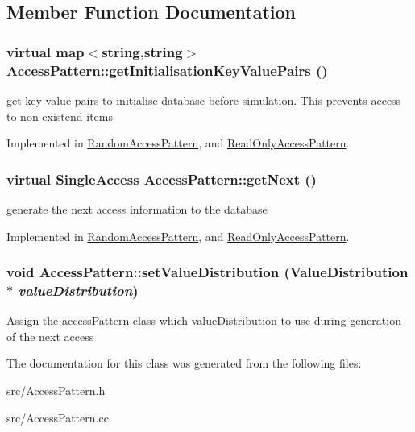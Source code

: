 \subsection{Member Function Documentation}
\hypertarget{classAccessPattern_afa72bed11401bfd96e8fa88acd72934b}{
\subsubsection[{getInitialisationKeyValuePairs}]{\setlength{\rightskip}{0pt plus 5cm}virtual map$<$string,string$>$ AccessPattern::getInitialisationKeyValuePairs ()}}
\label{classAccessPattern_afa72bed11401bfd96e8fa88acd72934b}
get key-\/value pairs to initialise database before simulation. This prevents access to non-\/existend items 

Implemented in \hyperlink{classRandomAccessPattern_a72da825a9cb74f58fcadf6fc894d5e82}{RandomAccessPattern}, and \hyperlink{classReadOnlyAccessPattern_a2e6ce8d90050b038ffbf643b344e0eb5}{ReadOnlyAccessPattern}.\hypertarget{classAccessPattern_a8c46aedb717e862598524f250f23086f}{
\subsubsection[{getNext}]{\setlength{\rightskip}{0pt plus 5cm}virtual {\bf SingleAccess} AccessPattern::getNext ()}}
\label{classAccessPattern_a8c46aedb717e862598524f250f23086f}
generate the next access information to the database 

Implemented in \hyperlink{classRandomAccessPattern_a5b590afc37a8bf5e4a4235834c6ebe12}{RandomAccessPattern}, and \hyperlink{classReadOnlyAccessPattern_a324b6da6296a17144d51db2841e16ba4}{ReadOnlyAccessPattern}.\hypertarget{classAccessPattern_a80227f44091a53a2798b44e4e54f3484}{
\subsubsection[{setValueDistribution}]{\setlength{\rightskip}{0pt plus 5cm}void AccessPattern::setValueDistribution ({\bf ValueDistribution} $\ast$ {\em valueDistribution})}}
\label{classAccessPattern_a80227f44091a53a2798b44e4e54f3484}
Assign the accessPattern class which valueDistribution to use during generation of the next access 

The documentation for this class was generated from the following files:\begin{DoxyCompactItemize}
\item 
src/AccessPattern.h\item 
src/AccessPattern.cc\end{DoxyCompactItemize}

